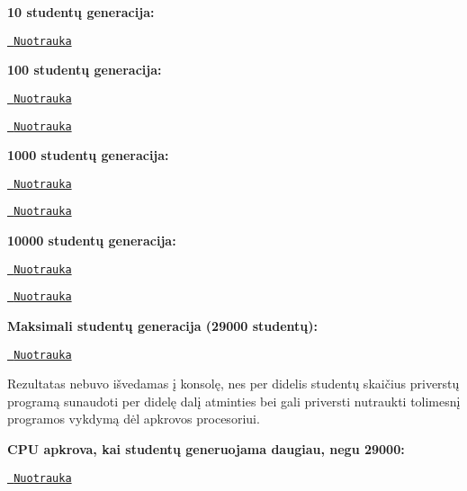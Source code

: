 \begin{DoxyItemize}
\item {\bfseries{10 studentų generacija\+:}}
\begin{DoxyItemize}
\item \href{https://imgur.com/GflAb6K.png}{\texttt{ Nuotrauka}}
\end{DoxyItemize}
\item {\bfseries{100 studentų generacija\+:}}
\begin{DoxyItemize}
\item \href{https://imgur.com/mxKBVGF.png}{\texttt{ Nuotrauka}}
\item \href{https://imgur.com/xZqENN0.png}{\texttt{ Nuotrauka}}
\end{DoxyItemize}
\item {\bfseries{1000 studentų generacija\+:}}
\begin{DoxyItemize}
\item \href{https://imgur.com/RquAXVO.png}{\texttt{ Nuotrauka}}
\item \href{https://imgur.com/3GHTgBF.png}{\texttt{ Nuotrauka}}
\end{DoxyItemize}
\item {\bfseries{10000 studentų generacija\+:}}
\begin{DoxyItemize}
\item \href{https://imgur.com/0jEeez4.png}{\texttt{ Nuotrauka}}
\item \href{https://imgur.com/WYi0t6p.png}{\texttt{ Nuotrauka}}
\end{DoxyItemize}
\item {\bfseries{Maksimali studentų generacija (29000 studentų)\+:}}
\begin{DoxyItemize}
\item \href{https://imgur.com/xJ9jNFd.png}{\texttt{ Nuotrauka}}
\item Rezultatas nebuvo išvedamas į konsolę, nes per didelis studentų skaičius priverstų programą sunaudoti per didelę dalį atminties bei gali priversti nutraukti tolimesnį programos vykdymą dėl apkrovos procesoriui.
\end{DoxyItemize}
\item {\bfseries{C\+PU apkrova, kai studentų generuojama daugiau, negu 29000\+:}}
\begin{DoxyItemize}
\item \href{https://imgur.com/AOXIeAf.png}{\texttt{ Nuotrauka}}
\end{DoxyItemize}
\end{DoxyItemize}

